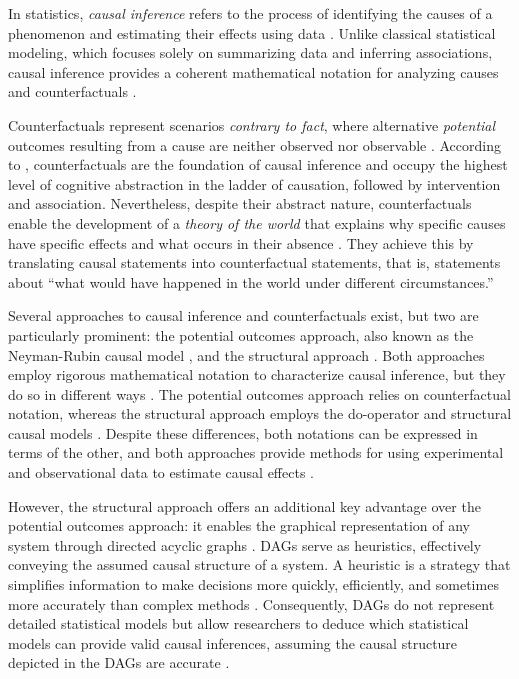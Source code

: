 \documentclass[
  authoryear,
  preprint,
  1p]{elsarticle}
\begin{document}
In statistics, \emph{causal inference} refers to the process of
identifying the causes of a phenomenon and estimating their effects
using data \citep{Shaughnessy_et_al_2010, Neal_2020}. Unlike classical
statistical modeling, which focuses solely on summarizing data and
inferring associations, causal inference provides a coherent
mathematical notation for analyzing causes and counterfactuals
\citep{Pearl_2009}.

Counterfactuals represent scenarios \emph{contrary to fact}, where
alternative \emph{potential} outcomes resulting from a cause are neither
observed nor observable \citep{Neal_2020, Counterfactual_2024}.
According to \citet{Pearl_et_al_2018}, counterfactuals are the
foundation of causal inference and occupy the highest level of cognitive
abstraction in the ladder of causation, followed by intervention and
association. Nevertheless, despite their abstract nature,
counterfactuals enable the development of a \emph{theory of the world}
that explains why specific causes have specific effects and what occurs
in their absence \citep{Pearl_et_al_2018}. They achieve this by
translating causal statements into counterfactual statements, that is,
statements about ``what would have happened in the world under different
circumstances.''

Several approaches to causal inference and counterfactuals exist, but
two are particularly prominent: the potential outcomes approach, also
known as the Neyman-Rubin causal model
\citep{Neyman_et_al_1923, Rubin_1974}, and the structural approach
\citep{Pearl_2009, Pearl_et_al_2016}. Both approaches employ rigorous
mathematical notation to characterize causal inference, but they do so
in different ways \citep{Neal_2020}. The potential outcomes approach
relies on counterfactual notation, whereas the structural approach
employs the do-operator and structural causal models
\citep[SCM,][]{Pearl_2009, Pearl_et_al_2016}. Despite these differences,
both notations can be expressed in terms of the other, and both
approaches provide methods for using experimental and observational data
to estimate causal effects \citep{Pearl_2010}.

However, the structural approach offers an additional key advantage over
the potential outcomes approach: it enables the graphical representation
of any system through directed acyclic graphs
\citep[DAG,][]{Gross_et_al_2018, Neal_2020}. DAGs serve as heuristics,
effectively conveying the assumed causal structure of a system. A
heuristic is a strategy that simplifies information to make decisions
more quickly, efficiently, and sometimes more accurately than complex
methods \citep{Chow_2015}. Consequently, DAGs do not represent detailed
statistical models but allow researchers to deduce which statistical
models can provide valid causal inferences, assuming the causal
structure depicted in the DAGs are accurate \citep{McElreath_2020}.
\end{document}
